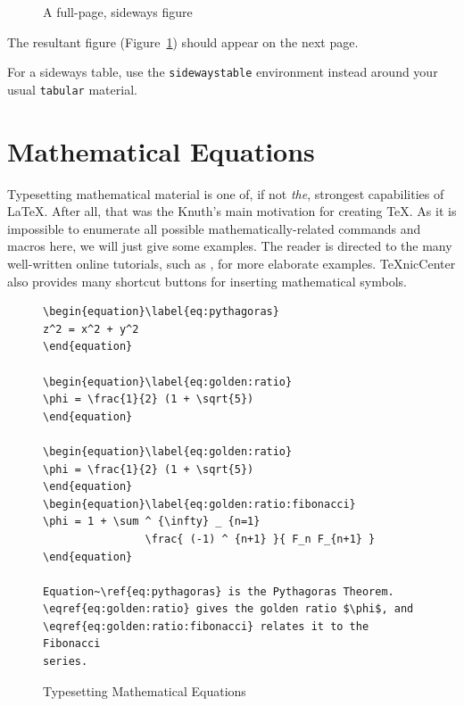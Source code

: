 \begin{figure}
  \centering
  \caption{A full-page, sideways figure}\label{fig:sidewaysfig}
\end{figure}

The resultant figure (Figure~\ref{fig:sidewaysfig}) should appear on the next page.

For a sideways table, use the \verb|sidewaystable| environment instead around your usual \verb|tabular| material.


\section{Mathematical Equations}


Typesetting mathematical material is one of, if not \emph{the}, strongest capabilities of \LaTeX.  After all, that was the Knuth's main motivation for creating \TeX{}.  As it is impossible to enumerate all possible mathematically-related commands and macros here, we will just give some examples.  The reader is directed to the many well-written online tutorials, such as \citep{roberts}, for more elaborate examples.  TeXnicCenter also provides many shortcut buttons for inserting mathematical symbols.

\begin{figure}[htb!]
  \begin{lstlisting}
\begin{equation}\label{eq:pythagoras}
z^2 = x^2 + y^2
\end{equation}

\begin{equation}\label{eq:golden:ratio}
\phi = \frac{1}{2} (1 + \sqrt{5})
\end{equation}

\begin{equation}\label{eq:golden:ratio}
\phi = \frac{1}{2} (1 + \sqrt{5})
\end{equation}
\begin{equation}\label{eq:golden:ratio:fibonacci}
\phi = 1 + \sum ^ {\infty} _ {n=1}
                \frac{ (-1) ^ {n+1} }{ F_n F_{n+1} }
\end{equation}

Equation~\ref{eq:pythagoras} is the Pythagoras Theorem. 
\eqref{eq:golden:ratio} gives the golden ratio $\phi$, and 
\eqref{eq:golden:ratio:fibonacci} relates it to the Fibonacci 
series.
\end{lstlisting}
  \caption{Typesetting Mathematical Equations}\label{fig:lst:equation}
\end{figure}

